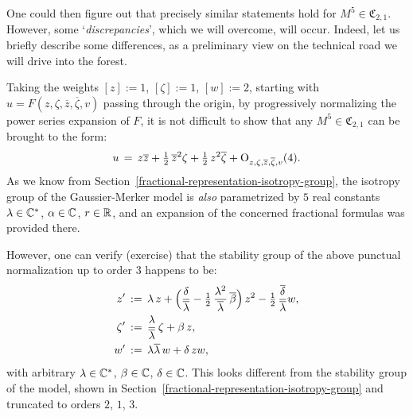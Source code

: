 \documentclass[12pt,twoside,leqno,openany]{amsart}
\begin{document}
One could then figure out that precisely similar statements hold for 
$M^5 \in \mathfrak{C}_{2,1}$.
However, some `{\sl discrepancies}', which we will overcome, will 
occur. Indeed, let us briefly describe some differences,
as a preliminary view on the technical road we will 
drive into the forest. 

Taking the weights $[z] := 1$, $[\zeta] := 1$, 
$[w] := 2$, starting with $u = F(z, \zeta, \overline{z}, 
\overline{\zeta}, v)$ passing through the origin,
by progressively normalizing the power series expansion 
of $F$, it is not difficult to show that any
$M^5 \in \mathfrak{C}_{2,1}$ can be brought to the form:
\[
u
\,=\,
z\overline{z}
+
\tfrac{1}{2}\,
\overline{z}^2\zeta
+
\tfrac{1}{2}\,
z^2\overline{\zeta}
+
{\rm O}_{z,\zeta,\overline{z},\overline{\zeta},v}(4).
\]
As we know from 
Section~{\ref{fractional-representation-isotropy-group}},
the isotropy group of the Gaussier-Merker model
is {\sl also} parametrized by $5$ real constants
$\lambda \in \mathbb{C}^\ast$, $\alpha \in \mathbb{C}$, $r \in \mathbb{R}$,
and an expansion of the concerned fractional formulas 
was provided there. 

However, one can verify (exercise) that the stability 
group of the above punctual normalization up to order
$3$ happens to be:
\[
\aligned
z'
&
\,:=\,
\lambda\,
z
+
\Big(
\frac{\delta}{\overline{\lambda}}
-
\tfrac{1}{2}\,
\frac{\lambda^2}{\overline{\lambda}}\,
\overline{\beta}
\Big)\,
z^2
-
\tfrac{1}{2}\,
\frac{\overline{\delta}}{\overline{\lambda}}
w,
\\
\zeta'
&
\,:=\,
\frac{\lambda}{\overline{\lambda}}\,
\zeta
+
\beta\,
z,
\\
w'
&
\,:=\,
\lambda\overline{\lambda}\,
w
+
\delta\,
zw,
\endaligned
\]
with arbitrary $\lambda \in \mathbb{C}^\ast$, $\beta \in \mathbb{C}$, 
$\delta \in \mathbb{C}$. This looks different from 
the stability group of 
the model, shown in
Section~{\ref{fractional-representation-isotropy-group}} 
and truncated to orders $2$, $1$, $3$.
\end{document}
